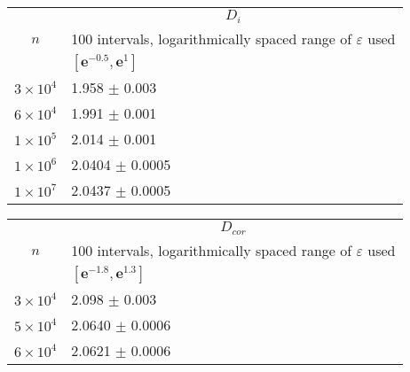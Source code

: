\begin{center}
\begin{tabular}{ |l|l| }

\hline
\multicolumn{1}{|c|}{\multirow{3}{*}{$n$}} & \multicolumn{1}{|c|}{$D_{i} $}\\
\cline{2-2}
&\multicolumn{1}{|c|}{100 intervals, logarithmically spaced range of $\varepsilon$ used}\\
\cline{2-2}
 &\rule{0pt}{12pt} \hspace{85pt} $[\boldsymbol{e}^{-0.5},\boldsymbol{e}^{1}]$ \\
\hline
$3\times 10^{4}$ & \hspace{80pt} 1.958 \hspace{5pt}$\pm$ 0.003  \\
\hline
$6\times 10^{4}$ & \hspace{80pt} 1.991 \hspace{5pt}$\pm$ 0.001  \\
\hline
$1\times 10^{5}$ & \hspace{80pt} 2.014 \hspace{5pt}$\pm$ 0.001   \\
\hline
$1\times 10^{6}$ & \hspace{80pt} 2.0404 $\pm$ 0.0005   \\
\hline
$1\times 10^{7}$ & \hspace{80pt} 2.0437 $\pm$ 0.0005  \\
\hline
\end{tabular}
\end{center}



\begin{center}
\begin{tabular}{ |l|l| }
\hline
\multicolumn{1}{|c|}{\multirow{3}{*}{$n$}} & \multicolumn{1}{|c|}{$D_{cor} $}\\
\cline{2-2}
&\multicolumn{1}{|c|}{100 intervals, logarithmically spaced range of $\varepsilon$ used}\\
\cline{2-2}
 &\rule{0pt}{12pt}  \hspace{85pt} $[\boldsymbol{e}^{-1.8},\boldsymbol{e}^{1.3}]$  \\
\hline
$3\times 10^{4}$ & \hspace{80pt} 2.098  \hspace{4pt} $\pm$ 0.003  \\
\hline
$5\times 10^{4}$ & \hspace{80pt} 2.0640 $\pm$ 0.0006 \\
\hline
$6\times 10^{4}$ & \hspace{80pt} 2.0621 $\pm$ 0.0006 \\
\hline
\end{tabular}
\end{center}

